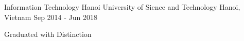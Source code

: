 

\begin{cventries}

    
  \cventry
    {Information Technology} %
    {Hanoi University of Sience and Technology} %
    {Hanoi, Vietnam} %
    {Sep 2014 - Jun 2018} %
    {
      \begin{cvitems} %
        \item {Graduated with Distinction}
      \end{cvitems}
    }
\end{cventries}
